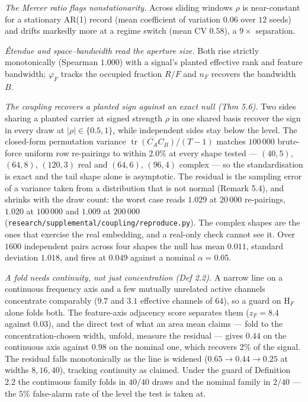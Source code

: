 \documentclass[10pt,letterpaper,twocolumn]{article}
\begin{document}
\emph{The Mercer ratio flags nonstationarity.} Across sliding windows \(\rho\) is near-constant for a stationary AR(1) record (mean coefficient of variation \(0.06\) over \(12\) seeds) and drifts markedly more at a regime switch (mean CV \(0.58\)), a \(9\times\) separation.

\emph{Étendue and space--bandwidth read the aperture size.} Both rise strictly monotonically (Spearman \(1.000\)) with a signal's planted effective rank and feature bandwidth; \(\varphi_F\) tracks the occupied fraction \(R/F\) and \(n_F\) recovers the bandwidth \(B\).

\emph{The coupling recovers a planted sign against an exact null (Thm 5.6).} Two sides sharing a planted carrier at signed strength \(\rho\) in one shared basis recover the sign in every draw at \(|\rho|\in\{0.5,1\}\), while independent sides stay below the level. The closed-form permutation variance \(\operatorname{tr}(C_AC_B)/(T-1)\) matches \(100\,000\) brute-force uniform row re-pairings to within \(2.0\%\) at every shape tested --- \((40,5)\), \((64,8)\), \((120,3)\) real and \((64,6)\), \((96,4)\) complex --- so the standardisation is exact and the tail shape alone is asymptotic. The residual is the sampling error of a variance taken from a distribution that is not normal (Remark 5.4), and shrinks with the draw count: the worst case reads \(1.029\) at \(20\,000\) re-pairings, \(1.020\) at \(100\,000\) and \(1.009\) at \(200\,000\) (\texttt{research/\allowbreak{}supplemental/\allowbreak{}coupling/\allowbreak{}reproduce.\allowbreak{}py}). The complex shapes are the ones that exercise the real embedding, and a real-only check cannot see it. Over \(1600\) independent pairs across four shapes the null has mean \(0.011\), standard deviation \(1.018\), and fires at \(0.049\) against a nominal \(\alpha=0.05\).

\emph{A fold needs continuity, not just concentration (Def 2.2).} A narrow line on a continuous frequency axis and a few mutually unrelated active channels concentrate comparably (\(9.7\) and \(3.1\) effective channels of \(64\)), so a guard on \(\mathrm{H}_F\) alone folds both. The feature-axis adjacency score separates them (\(z_F=8.4\) against \(0.03\)), and the direct test of what an area mean claims --- fold to the concentration-chosen width, unfold, measure the residual --- gives \(0.44\) on the continuous axis against \(0.98\) on the nominal one, which recovers \(2\%\) of the signal. The residual falls monotonically as the line is widened (\(0.65\to0.44\to0.25\) at widths \(8,16,40\)), tracking continuity as claimed. Under the guard of Definition 2.2 the continuous family folds in \(40/40\) draws and the nominal family in \(2/40\) --- the \(5\%\) false-alarm rate of the level the test is taken at.
\end{document}
